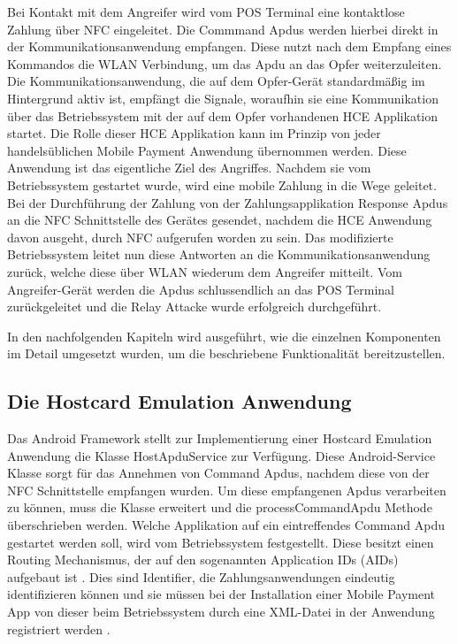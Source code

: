  Bei Kontakt mit dem Angreifer wird vom POS Terminal eine kontaktlose Zahlung über NFC eingeleitet. Die Commmand Apdus werden hierbei direkt in der Kommunikationsanwendung empfangen. Diese nutzt nach dem Empfang eines Kommandos die WLAN Verbindung, um das Apdu an das Opfer weiterzuleiten. Die Kommunikationsanwendung, die auf dem Opfer-Gerät standardmäßig im Hintergrund aktiv ist, empfängt die Signale, woraufhin sie eine Kommunikation über das Betriebssystem mit der auf dem Opfer vorhandenen HCE Applikation startet. Die Rolle dieser HCE Applikation kann im Prinzip von jeder handelsüblichen Mobile Payment Anwendung übernommen werden. Diese Anwendung ist das eigentliche Ziel des Angriffes. Nachdem sie vom Betriebssystem gestartet wurde, wird eine mobile Zahlung in die Wege geleitet. 
Bei der Durchführung der Zahlung von der Zahlungsapplikation Response Apdus an die NFC Schnittstelle des Gerätes gesendet, nachdem die HCE Anwendung davon ausgeht, durch NFC aufgerufen worden zu sein. 
Das modifizierte Betriebssystem leitet nun diese Antworten an die Kommunikationsanwendung zurück, welche diese über WLAN wiederum dem Angreifer mitteilt. Vom Angreifer-Gerät werden die Apdus schlussendlich an das POS Terminal zurückgeleitet und die Relay Attacke wurde erfolgreich durchgeführt. 

In den nachfolgenden Kapiteln wird ausgeführt, wie die einzelnen Komponenten im Detail umgesetzt wurden, um die beschriebene Funktionalität bereitzustellen. 

\subsection{Die Hostcard Emulation Anwendung}

Das Android Framework stellt zur Implementierung einer Hostcard Emulation Anwendung die Klasse HostApduService zur Verfügung. Diese Android-Service Klasse sorgt für das Annehmen von Command Apdus, nachdem diese von der NFC Schnittstelle empfangen wurden. Um diese empfangenen Apdus verarbeiten zu können, muss die Klasse erweitert und die processCommandApdu Methode überschrieben werden. 
Welche Applikation auf ein eintreffendes Command Apdu gestartet werden soll, wird vom Betriebssystem festgestellt. Diese besitzt einen Routing Mechanismus, der auf den sogenannten Application IDs (AIDs) aufgebaut ist \cite{androidHce}. Dies sind Identifier, die Zahlungsanwendungen eindeutig identifizieren können und sie müssen bei der Installation einer Mobile Payment App von dieser beim Betriebssystem durch eine XML-Datei in der Anwendung registriert werden \cite{androidHce}.

